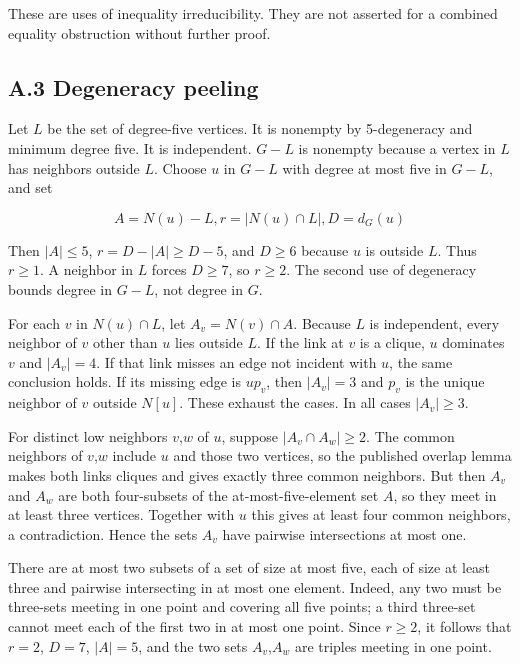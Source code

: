 \documentclass[11pt]{article}
\begin{document}
These are uses of inequality irreducibility. They are not asserted for a
combined equality obstruction without further proof.

\subsection{A.3 Degeneracy peeling}\label{a.3-degeneracy-peeling}

Let \(L\) be the set of degree-five vertices. It is nonempty by
5-degeneracy and minimum degree five. It is independent. \(G-L\) is
nonempty because a vertex in \(L\) has neighbors outside \(L\). Choose
\(u\) in \(G-L\) with degree at most five in \(G-L\), and set

\[A=N(u)-L,  r=|N(u)\cap L|,  D=d_G(u)\]

Then \(|A|\le 5\), \(r=D-|A|\ge D-5\), and \(D\ge 6\) because \(u\) is
outside \(L\). Thus \(r\ge 1\). A neighbor in \(L\) forces \(D\ge 7\),
so \(r\ge 2\). The second use of degeneracy bounds degree in \(G-L\),
not degree in \(G\).

For each \(v\) in \(N(u)\cap L\), let \(A_v=N(v)\cap A\). Because \(L\)
is independent, every neighbor of \(v\) other than \(u\) lies outside
\(L\). If the link at \(v\) is a clique, \(u\) dominates \(v\) and
\(|A_v|=4\). If that link misses an edge not incident with \(u\), the
same conclusion holds. If its missing edge is \(up_v\), then \(|A_v|=3\)
and \(p_v\) is the unique neighbor of \(v\) outside \(N[u]\). These
exhaust the cases. In all cases \(|A_v|\ge 3\).

For distinct low neighbors \(v\),\(w\) of \(u\), suppose
\(|A_v\cap A_w|\ge 2\). The common neighbors of \(v\),\(w\) include
\(u\) and those two vertices, so the published overlap lemma makes both
links cliques and gives exactly three common neighbors. But then \(A_v\)
and \(A_w\) are both four-subsets of the at-most-five-element set \(A\),
so they meet in at least three vertices. Together with \(u\) this gives
at least four common neighbors, a contradiction. Hence the sets \(A_v\)
have pairwise intersections at most one.

There are at most two subsets of a set of size at most five, each of
size at least three and pairwise intersecting in at most one element.
Indeed, any two must be three-sets meeting in one point and covering all
five points; a third three-set cannot meet each of the first two in at
most one point. Since \(r\ge 2\), it follows that \(r=2\), \(D=7\),
\(|A|=5\), and the two sets \(A_v\),\(A_w\) are triples meeting in one
point.
\end{document}
